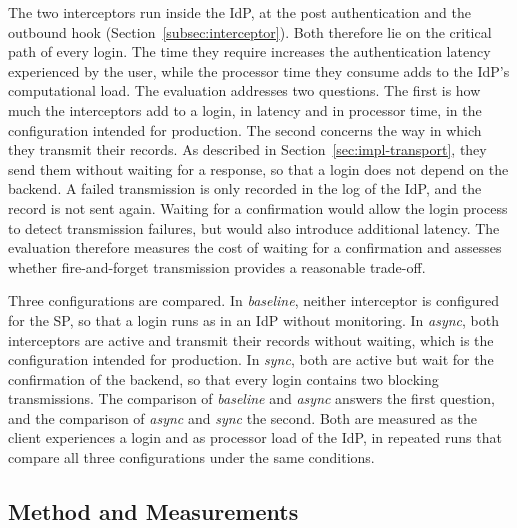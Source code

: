 \documentclass[../main.tex]{subfiles}
\begin{document}
The two interceptors run inside the IdP, at the post authentication and the outbound hook 
(Section~\ref{subsec:interceptor}). 
Both therefore lie on the critical path of every login. 
The time they require increases the authentication latency experienced by the user, while the 
processor time they consume adds to the IdP's computational load. 
The evaluation addresses two questions. 
The first is how much the interceptors add to a login, in latency and in processor time, in the 
configuration intended for production. 
The second concerns the way in which they transmit their records. 
As described in Section~\ref{sec:impl-transport}, they send them without waiting for a response, 
so that a login does not depend on the backend. 
A failed transmission is only recorded in the log of the IdP, and the record is not sent again. 
Waiting for a confirmation would allow the login process to detect transmission failures, but would 
also introduce additional latency. 
The evaluation therefore measures the cost of waiting for a confirmation and assesses 
whether fire-and-forget transmission provides a reasonable trade-off. 

Three configurations are compared. 
In \textit{baseline}, neither interceptor is configured for the SP, so that a login runs as in an 
IdP without monitoring. 
In \textit{async}, both interceptors are active and transmit their records without waiting, which 
is the configuration intended for production. 
In \textit{sync}, both are active but wait for the confirmation of the backend, so that every login 
contains two blocking transmissions. 
The comparison of \textit{baseline} and \textit{async} answers the first question, and the 
comparison of \textit{async} and \textit{sync} the second. 
Both are measured as the client experiences a login and as processor load of the IdP, in repeated 
runs that compare all three configurations under the same conditions. 

\subsection{Method and Measurements}\label{subsec:eval-overhead-method}
\end{document}
